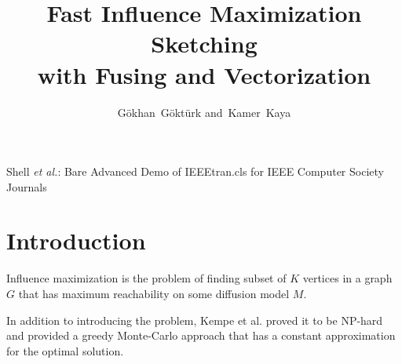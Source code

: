 \documentclass[10pt,journal,compsoc]{IEEEtran}
\begin{document}
\title{Fast Influence Maximization Sketching\\ with Fusing and Vectorization }


\author{G\"{o}khan~G\"{o}kt\"{u}rk
        and~Kamer~Kaya%
}



%
{Shell \MakeLowercase{\textit{et al.}}: Bare Advanced Demo of IEEEtran.cls for IEEE Computer Society Journals}




\maketitle

\IEEEdisplaynontitleabstractindextext
\IEEEpeerreviewmaketitle


\ifCLASSOPTIONcompsoc
{}
\else
\section{Introduction}
\label{sec:introduction}
\fi

Influence maximization is the problem of finding subset of $K$ vertices in a graph $G$ that has maximum reachability on some diffusion model $M$. 

In addition to introducing the problem, Kempe et al.\cite{kempe2003maximizing} proved it to be NP-hard and provided a greedy Monte-Carlo approach that has a constant approximation for the optimal solution.
\end{document}
